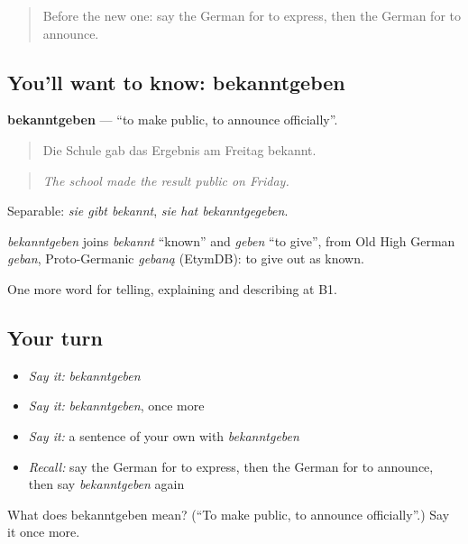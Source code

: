 \label{lesson:GE-C273-bekanntgeben}



\begin{quote}
Before the new one: say the German for to express, then the German for to announce.
\end{quote}

\subsection*{You'll want to know: bekanntgeben}
\textbf{bekanntgeben} — \textquotedblleft{}to make public, to announce officially\textquotedblright{}.

\begin{quote}
Die Schule gab das Ergebnis am Freitag bekannt.
\end{quote}

\begin{quote}
\emph{The school made the result public on Friday.}
\end{quote}

Separable: \emph{sie gibt bekannt}, \emph{sie hat bekanntgegeben}.

\begin{cousinweb}
\emph{bekanntgeben} joins \emph{bekannt} \textquotedblleft{}known\textquotedblright{} and \emph{geben} \textquotedblleft{}to give\textquotedblright{}, from Old High German \emph{geban}, Proto-Germanic \emph{gebaną} (EtymDB): to give out as known.
\end{cousinweb}

\begin{grammarlens}[title={What you've built}]
One more word for telling, explaining and describing at B1.
\end{grammarlens}

\subsection*{Your turn}
\begin{itemize}
\raggedright
  \item \emph{Say it:} \emph{bekanntgeben}
  \item \emph{Say it:} \emph{bekanntgeben}, once more
  \item \emph{Say it:} a sentence of your own with \emph{bekanntgeben}
  \item \emph{Recall:} say the German for to express, then the German for to announce, then say \emph{bekanntgeben} again
\end{itemize}

\begin{tcolorbox}[breakable,colback=teal!4,colframe=teal!35!black,title={Before you move on}]
What does bekanntgeben mean? (\textquotedblleft{}To make public, to announce officially\textquotedblright{}.) Say it once more.
\end{tcolorbox}
